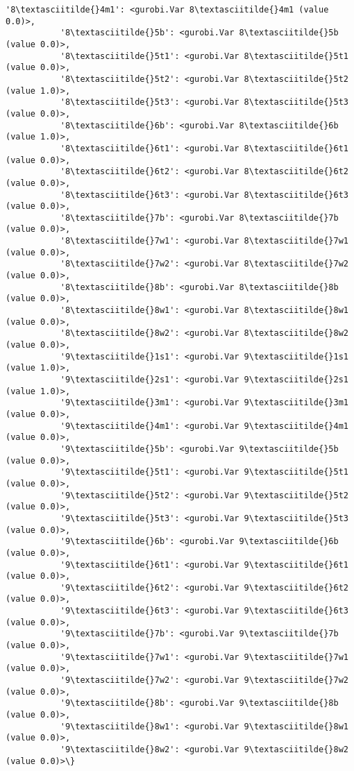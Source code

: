 \documentclass[11pt]{article}
\begin{document}
\begin{Verbatim}[commandchars=\\\{\}]
           '8\textasciitilde{}4m1': <gurobi.Var 8\textasciitilde{}4m1 (value 0.0)>,
           '8\textasciitilde{}5b': <gurobi.Var 8\textasciitilde{}5b (value 0.0)>,
           '8\textasciitilde{}5t1': <gurobi.Var 8\textasciitilde{}5t1 (value 0.0)>,
           '8\textasciitilde{}5t2': <gurobi.Var 8\textasciitilde{}5t2 (value 1.0)>,
           '8\textasciitilde{}5t3': <gurobi.Var 8\textasciitilde{}5t3 (value 0.0)>,
           '8\textasciitilde{}6b': <gurobi.Var 8\textasciitilde{}6b (value 1.0)>,
           '8\textasciitilde{}6t1': <gurobi.Var 8\textasciitilde{}6t1 (value 0.0)>,
           '8\textasciitilde{}6t2': <gurobi.Var 8\textasciitilde{}6t2 (value 0.0)>,
           '8\textasciitilde{}6t3': <gurobi.Var 8\textasciitilde{}6t3 (value 0.0)>,
           '8\textasciitilde{}7b': <gurobi.Var 8\textasciitilde{}7b (value 0.0)>,
           '8\textasciitilde{}7w1': <gurobi.Var 8\textasciitilde{}7w1 (value 0.0)>,
           '8\textasciitilde{}7w2': <gurobi.Var 8\textasciitilde{}7w2 (value 0.0)>,
           '8\textasciitilde{}8b': <gurobi.Var 8\textasciitilde{}8b (value 0.0)>,
           '8\textasciitilde{}8w1': <gurobi.Var 8\textasciitilde{}8w1 (value 0.0)>,
           '8\textasciitilde{}8w2': <gurobi.Var 8\textasciitilde{}8w2 (value 0.0)>,
           '9\textasciitilde{}1s1': <gurobi.Var 9\textasciitilde{}1s1 (value 1.0)>,
           '9\textasciitilde{}2s1': <gurobi.Var 9\textasciitilde{}2s1 (value 1.0)>,
           '9\textasciitilde{}3m1': <gurobi.Var 9\textasciitilde{}3m1 (value 0.0)>,
           '9\textasciitilde{}4m1': <gurobi.Var 9\textasciitilde{}4m1 (value 0.0)>,
           '9\textasciitilde{}5b': <gurobi.Var 9\textasciitilde{}5b (value 0.0)>,
           '9\textasciitilde{}5t1': <gurobi.Var 9\textasciitilde{}5t1 (value 0.0)>,
           '9\textasciitilde{}5t2': <gurobi.Var 9\textasciitilde{}5t2 (value 0.0)>,
           '9\textasciitilde{}5t3': <gurobi.Var 9\textasciitilde{}5t3 (value 0.0)>,
           '9\textasciitilde{}6b': <gurobi.Var 9\textasciitilde{}6b (value 0.0)>,
           '9\textasciitilde{}6t1': <gurobi.Var 9\textasciitilde{}6t1 (value 0.0)>,
           '9\textasciitilde{}6t2': <gurobi.Var 9\textasciitilde{}6t2 (value 0.0)>,
           '9\textasciitilde{}6t3': <gurobi.Var 9\textasciitilde{}6t3 (value 0.0)>,
           '9\textasciitilde{}7b': <gurobi.Var 9\textasciitilde{}7b (value 0.0)>,
           '9\textasciitilde{}7w1': <gurobi.Var 9\textasciitilde{}7w1 (value 0.0)>,
           '9\textasciitilde{}7w2': <gurobi.Var 9\textasciitilde{}7w2 (value 0.0)>,
           '9\textasciitilde{}8b': <gurobi.Var 9\textasciitilde{}8b (value 0.0)>,
           '9\textasciitilde{}8w1': <gurobi.Var 9\textasciitilde{}8w1 (value 0.0)>,
           '9\textasciitilde{}8w2': <gurobi.Var 9\textasciitilde{}8w2 (value 0.0)>\}
\end{Verbatim}
        
\end{document}
